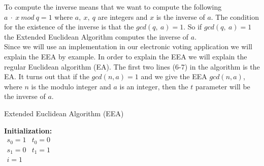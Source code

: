  To compute the inverse means that we want to compute the following \begin{math}a\ \cdot \ x \ mod \ q = 1 \end{math} where $a, \ x, \ q$ are integers and $x$ is the inverse of $a$. The condition for the existence of the inverse is that the $gcd(q,\ a)= 1$. So if $gcd(q,\ a)= 1$ the Extended Euclidean Algorithm computes the inverse of $a$.\\


\noindent
{} Since we will use an implementation in our electronic voting application we will explain the EEA by example. In order to explain the EEA we will explain the regular Euclidean algorithm (EA). The first two lines (6-7) in the algorithm is the EA. It turns out that if the $gcd(n,a)=1$  and we give the EEA $gcd(n,a)$, where $n$ is the modulo integer and $a$ is an integer, then the $t$ parameter will be the inverse of $a$. 

\begin{center}
\begin{algorithm}[H]
\caption{Extended Euclidean Algorithm (EEA)\label{alg}}



\textbf{Initialization:} \\
$
\begin{array}{ll}
    s_0 = 1   & t_0 = 0 \\
    s_1 = 0   & t_1 = 1 \\
      i = 1     &           \\
\end{array}                 
$

\end{algorithm}
\end{center}


